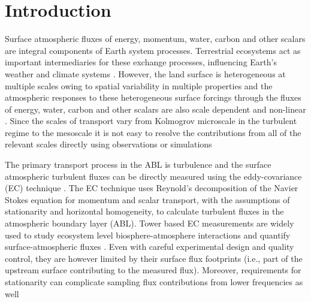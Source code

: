 \documentclass[draft]{agujournal2019}
\begin{document}
%
%
%
%


\section{Introduction}
Surface atmospheric fluxes of energy, momentum, water, carbon and other scalars
are integral components of Earth system processes. Terrestrial ecosystems act as
important intermediaries for these exchange processes, influencing Earth’s weather and climate systems \cite{pielke_interactions_1998}. However, the land surface is heterogeneous at multiple scales owing to spatial variability in multiple properties and the atmospheric responses to these heterogeneous surface forcings through the fluxes of energy, water, carbon and other scalars are also scale dependent and non-linear \cite{avissar_evaluation_1998}. Since the scales of transport vary from Kolmogrov microscale in the turbulent regime to the mesoscale it is not easy to resolve the contributions from all of the relevant scales directly using observations or simulations \cite{bou-zeid_persistent_2020}

The primary transport process in the ABL is turbulence and the surface atmospheric turbulent fluxes can be directly measured using the eddy-covariance (EC) technique \cite{aubinet_eddy_2012, foken_micrometeorology_2017}. The EC technique uses Reynold’s decomposition of the Navier Stokes equation for momentum and scalar transport, with the assumptions of stationarity and horizontal homogeneity, to calculate turbulent fluxes in the atmospheric boundary layer (ABL). Tower based EC measurements are widely used to study ecosystem level biosphere-atmosphere interactions and quantify surface-atmospheric fluxes \cite{aubinet_estimates_1999, baldocchi_fluxnet_2001}. Even with careful experimental design and quality control, they are however limited by their surface flux footprints (i.e., part of the upstream surface contributing to the measured flux).  Moreover, requirements for stationarity can complicate sampling flux contributions from lower frequencies as well \cite{desjardins_scaling_1997, mahrt_computing_2010} 
\end{document}
